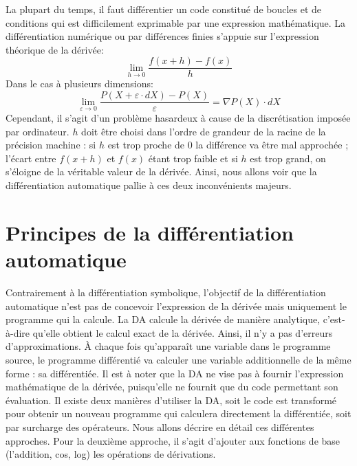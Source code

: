 La  plupart du temps, il faut diff\'erentier un code constitu\'e de
boucles et de conditions qui est difficilement exprimable par une expression
math\'ematique.
 La diff\'erentiation num\'erique ou par diff\'erences finies
s'appuie sur l'expression th\'eorique de la d\'eriv\'ee: 
$$\lim_{h\rightarrow 0}\frac{f(x+h)-f(x)}{h}$$
Dans le cas \`a plusieurs dimensions:
$$\lim_{\varepsilon \rightarrow 0}\frac{P(X+\varepsilon \cdot dX)-P(X)}{\varepsilon} =
 \nabla P(X)\cdot dX$$
Cependant, il s'agit d'un probl\`eme hasardeux \`a cause de la
discr\'etisation impos\'ee par ordinateur. $h$ doit être choisi dans l'ordre de
 grandeur de la racine de la pr\'ecision machine : si $h$ est trop proche de $0$ la
diff\'erence va être mal approch\'ee ; l'\'ecart entre $f(x+h)$ et $f(x)$
 \'etant trop faible et si $h$ est trop grand, on s'\'eloigne de la v\'eritable
valeur de la d\'eriv\'ee. Ainsi, nous allons voir que la diff\'erentiation
automatique pallie \`a ces deux inconv\'enients majeurs. \\






\section{Principes de la diff\'erentiation automatique}
\label{sec:da}

{\co Contrairement \`a la diff\'erentiation symbolique, l'objectif de la diff\'erentiation automatique n'est pas de concevoir l'expression de la d\'eriv\'ee mais uniquement
le programme qui la calcule.}
La DA calcule la d\'eriv\'ee de mani\`ere analytique, c'est-\`a-dire qu'elle obtient le calcul exact de la d\'eriv\'ee. Ainsi, il n'y a pas d'erreurs
d'approximations. \`A chaque fois qu'appara\^it une variable dans le programme source,
le programme diff\'erenti\'e va calculer une variable additionnelle de la même forme : sa diff\'erenti\'ee.
Il est \`a noter que la DA ne vise pas \`a fournir l'expression math\'ematique de la d\'eriv\'ee, puisqu'elle ne fournit que du
code permettant son \'evaluation.
Il existe deux mani\`eres d'utiliser la DA, soit le code est transform\'e pour obtenir un nouveau programme qui
calculera directement la diff\'erenti\'ee, soit par surcharge des op\'erateurs. Nous allons d\'ecrire en d\'etail ces diff\'erentes approches.
Pour la deuxi\`eme approche, il s'agit d'ajouter aux fonctions de base (l'addition, cos, log) les op\'erations de d\'erivations.

